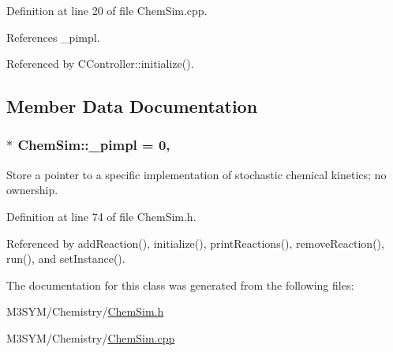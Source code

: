 Definition at line 20 of file Chem\+Sim.\+cpp.



References \+\_\+pimpl.



Referenced by C\+Controller\+::initialize().



\subsection{Member Data Documentation}
\hypertarget{classChemSim_a925fca4c4b0e800007163500b8b7909d}{
\subsubsection[{\+\_\+pimpl}]{ $\ast$ Chem\+Sim\+::\+\_\+pimpl = 0\hspace{0.3cm}{\ttfamily [static]}, {\ttfamily [private]}}}\label{classChemSim_a925fca4c4b0e800007163500b8b7909d}


Store a pointer to a specific implementation of stochastic chemical kinetics; no ownership. 



Definition at line 74 of file Chem\+Sim.\+h.



Referenced by add\+Reaction(), initialize(), print\+Reactions(), remove\+Reaction(), run(), and set\+Instance().



The documentation for this class was generated from the following files\+:\begin{DoxyCompactItemize}
\item 
M3\+S\+Y\+M/\+Chemistry/\hyperlink{ChemSim_8h}{Chem\+Sim.\+h}\item 
M3\+S\+Y\+M/\+Chemistry/\hyperlink{ChemSim_8cpp}{Chem\+Sim.\+cpp}\end{DoxyCompactItemize}
